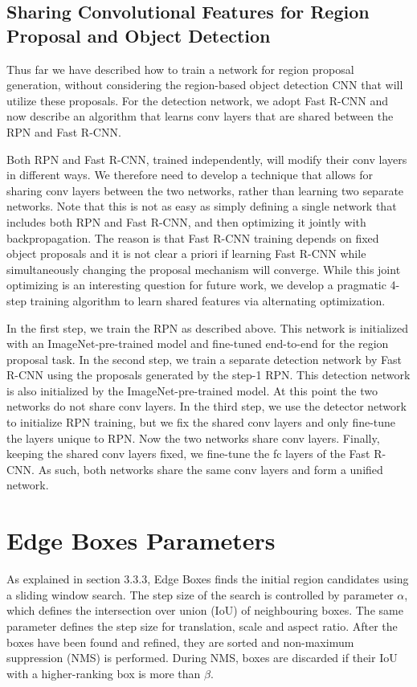 \subsection{Sharing Convolutional Features for Region Proposal and Object Detection}
Thus far we have described how to train a network for region proposal generation, without considering the region-based object detection CNN that will utilize these proposals. For the detection network, we adopt Fast R-CNN and now describe an algorithm that learns conv layers that are shared between the RPN and Fast R-CNN.

Both RPN and Fast R-CNN, trained independently, will modify their conv layers in different ways.
We therefore need to develop a technique that allows for sharing conv layers between the two networks, rather than learning two separate networks. Note that this is not as easy as simply defining a single network that includes both RPN and Fast R-CNN, and then optimizing it jointly with backpropagation. The reason is that Fast R-CNN training depends on fixed object proposals and it is
not clear a priori if learning Fast R-CNN while simultaneously changing the proposal mechanism will converge. While this joint optimizing is an interesting question for future work, we develop a pragmatic 4-step training algorithm to learn shared features via alternating optimization.

In the first step, we train the RPN as described above. This network is initialized with an ImageNet-pre-trained model and fine-tuned end-to-end for the region proposal task. In the second step, we train a separate detection network by Fast R-CNN using the proposals generated by the step-1 RPN. This detection network is also initialized by the ImageNet-pre-trained model. At this point the two networks do not share conv layers. In the third step, we use the detector network to initialize RPN training, but we fix the shared conv layers and only fine-tune the layers unique to RPN. Now the two networks share conv layers. Finally, keeping the shared conv layers fixed, we fine-tune the fc layers of the Fast R-CNN. As such, both networks share the same conv layers and form a unified network.


\section{Edge Boxes Parameters}
As explained in section 3.3.3, Edge Boxes finds the initial region candidates using a sliding window search. The step size of the search is controlled by parameter $\alpha$, which defines the intersection over union (IoU) of neighbouring boxes. The same parameter defines the step size for translation, scale and aspect ratio. After the boxes have been found and refined, they are sorted and non-maximum suppression (NMS) is performed. During NMS, boxes are discarded if their IoU with a higher-ranking box is more than $\beta$.

